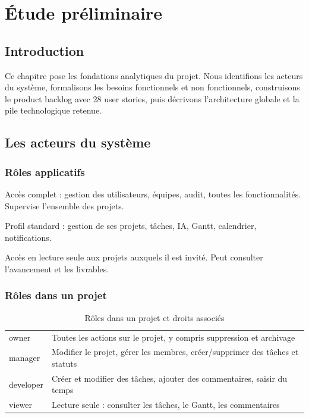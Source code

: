 \chapter{Étude préliminaire}

\section*{Introduction}
Ce chapitre pose les fondations analytiques du projet. Nous identifions les acteurs
du système, formalisons les besoins fonctionnels et non fonctionnels, construisons
le product backlog avec 28 user stories, puis décrivons l'architecture globale et
la pile technologique retenue.

\section{Les acteurs du système}

\subsection{Rôles applicatifs}

\begin{description}[leftmargin=2.5cm]
  \item[\textbf{Admin}]   Accès complet : gestion des utilisateurs, équipes, audit,
        toutes les fonctionnalités. Supervise l'ensemble des projets.
  \item[\textbf{Member}]  Profil standard : gestion de ses projets, tâches, IA,
        Gantt, calendrier, notifications.
  \item[\textbf{Client}]  Accès en lecture seule aux projets auxquels il est invité.
        Peut consulter l'avancement et les livrables.
\end{description}

\subsection{Rôles dans un projet}

\begin{table}[H]
  \centering
  \caption{Rôles dans un projet et droits associés}
  \label{tab:roles_projet}
  \begin{tabularx}{\textwidth}{L{2.5cm}X}
    \toprule
     &  \\
    \midrule
    owner   & Toutes les actions sur le projet, y compris suppression et archivage \\
    manager & Modifier le projet, gérer les membres, créer/supprimer des tâches et statuts \\
    developer & Créer et modifier des tâches, ajouter des commentaires, saisir du temps \\
    viewer  & Lecture seule : consulter les tâches, le Gantt, les commentaires \\
    \bottomrule
  \end{tabularx}
\end{table}

